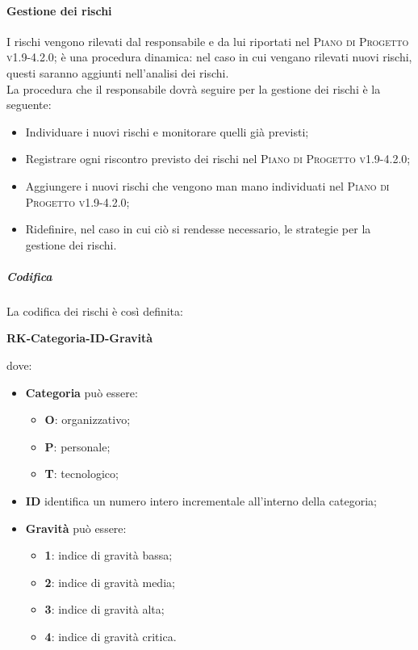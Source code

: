 \paragraph{Gestione dei rischi}
I rischi vengono rilevati dal responsabile e da lui riportati nel \textsc{Piano di Progetto v1.9-4.2.0}; è una procedura dinamica: nel caso in cui vengano rilevati nuovi rischi, questi saranno aggiunti nell'analisi dei rischi. \\
La procedura che il responsabile dovrà seguire per la gestione dei rischi è la seguente:
\begin{itemize}
  \item Individuare i nuovi rischi e monitorare quelli già previsti;
  \item Registrare ogni riscontro previsto dei rischi nel \textsc{Piano di Progetto v1.9-4.2.0};
  \item Aggiungere i nuovi rischi che vengono man mano individuati nel \textsc{Piano di Progetto v1.9-4.2.0};
  \item Ridefinire, nel caso in cui ciò si rendesse necessario, le strategie per la gestione dei rischi.
\end{itemize}
\subparagraph*{Codifica}
La codifica dei rischi è così definita: \\
\begin{center}
\centering
\textbf{RK-Categoria-ID-Gravità}
\end{center} dove:
\begin{itemize}
  \item \textbf{Categoria} può essere:
  \begin{itemize}
    \item \textbf{O}: organizzativo;
    \item \textbf{P}: personale;
    \item \textbf{T}: tecnologico;
  \end{itemize}
  \item \textbf{ID} identifica un numero intero incrementale all'interno della categoria;
  \item \textbf{Gravità} può essere:
  \begin{itemize}
    \item \textbf{1}: indice di gravità bassa;
    \item \textbf{2}: indice di gravità media;
    \item \textbf{3}: indice di gravità alta;
    \item \textbf{4}: indice di gravità critica.
  \end{itemize}
\end{itemize}

